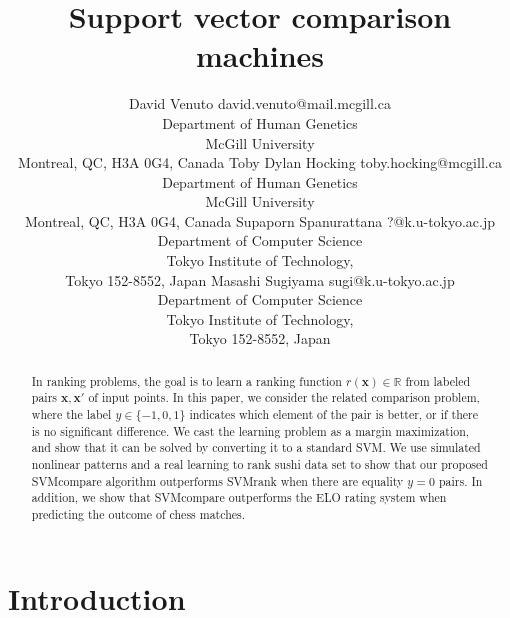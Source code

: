 \documentclass[twoside,11pt]{article}
\newcommand{\RR}{\mathbb R}
\begin{document}
	
	\title{Support vector comparison machines}
	
	\author{\name David Venuto \email david.venuto@mail.mcgill.ca \\
		\addr Department of Human Genetics\\
		McGill University \\
		Montreal, QC, H3A 0G4, Canada
		\AND
		\name Toby Dylan Hocking \email toby.hocking@mcgill.ca \\
		\addr Department of Human Genetics\\
		McGill University \\
		Montreal, QC, H3A 0G4, Canada
		\AND
		\name Supaporn Spanurattana \email ?@k.u-tokyo.ac.jp \\
		\addr Department of Computer Science\\
		Tokyo Institute of Technology,  \\
		Tokyo 152-8552, Japan
		\AND
		\name Masashi Sugiyama \email sugi@k.u-tokyo.ac.jp \\
		\addr Department of Computer Science\\
		Tokyo Institute of Technology,  \\
		Tokyo 152-8552, Japan}
	
	
\maketitle


\begin{abstract}
  In ranking problems, the goal is to learn a ranking function
  $r(\mathbf x)\in\RR$ from labeled pairs $\mathbf x,\mathbf x'$ of
  input points. In this paper, we consider the related comparison
  problem, where the label $y\in\{-1,0,1\}$ indicates which element of
  the pair is better, or if there is no significant difference. We
  cast the learning problem as a margin maximization, and show that it
  can be solved by converting it to a standard SVM. We use simulated
  nonlinear patterns and a real learning to rank sushi data set to
  show that our proposed SVMcompare algorithm outperforms SVMrank when
  there are equality $y=0$ pairs.  In addition, we show that SVMcompare outperforms the ELO rating system when predicting the outcome of chess matches.
\end{abstract}

\tableofcontents
\newpage

\section{Introduction}
\end{document}
